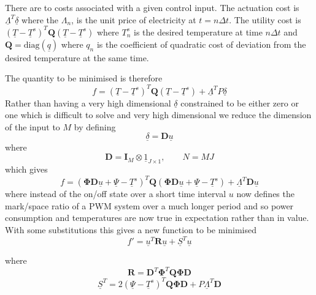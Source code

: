 \documentclass[11pt]{article}
\begin{document}
\section{}
There are to costs associated with a given control input. The actuation cost is $\underline{\Lambda}^{T} \underline{\delta}$ where the $\Lambda_{n}$, is the unit price of electricity at $t=n \Delta t$. The utility cost is $(\underline{T}-\underline{T}^s)^{T}\mathbf{Q}(\underline{T}-\underline{T}^s)$ where ${T}^{s}_{n}$ is the desired temperature at time $n \Delta t$ and $\mathbf{Q}=\mathrm{diag}(\underline{q})$ where $q_{n}$ is the coefficient of quadratic cost of deviation from the desired temperature at the same time.

The quantity to be minimised is therefore
\begin{equation}
f = (\underline{T}-\underline{T}^s)^{T}\mathbf{Q}(\underline{T}-\underline{T}^s)+\underline{\Lambda}^{T} P\underline{\delta}
\end{equation}
Rather than having a very high dimensional $\underline{\delta}$ constrained to be either zero or one which is difficult to solve and very high dimensional we reduce the dimension of the input to $M$ by defining
\begin{equation}
\underline{\delta}=\mathbf{D}\underline{u}
\end{equation}
where
\begin{equation}
\mathbf{D}=\mathbf{I}_{M} \otimes \underline{1}_{J \times 1},\qquad N=MJ
\end{equation}
which gives
\begin{equation}
f = (\mathbf{\Phi} \mathbf{D}\underline{u}+\underline{\Psi}-\underline{T}^s)^{T}\mathbf{Q}(\mathbf{\Phi} \mathbf{D}\underline{u}+\underline{\Psi}-\underline{T}^s)+\underline{\Lambda}^{T} \mathbf{D}\underline{u}
\end{equation}
where instead of the on/off state over a short time interval $u$ now defines the mark/space ratio of a PWM system over a much longer period and so power consumption and temperatures are now true in expectation rather than in value. With some substitutions this gives a new function to be minimised
\begin{equation}
f'=\underline{u}^{T}\mathbf{R}\underline{u}+\underline{S}^{T}\underline{u}
\end{equation}

where
\begin{equation}
\mathbf{R}=\mathbf{D}^{T}\mathbf{\Phi}^{T}\mathbf{Q}\mathbf{\Phi}\mathbf{D}
\end{equation}
\begin{equation}
\underline{S}^{T}=2(\underline{\Psi}-\underline{T}^s)^{T}\mathbf{Q}\mathbf{\Phi}\mathbf{D}+P\underline{\Lambda}^{T} \mathbf{D}
\end{equation}
\end{document}
